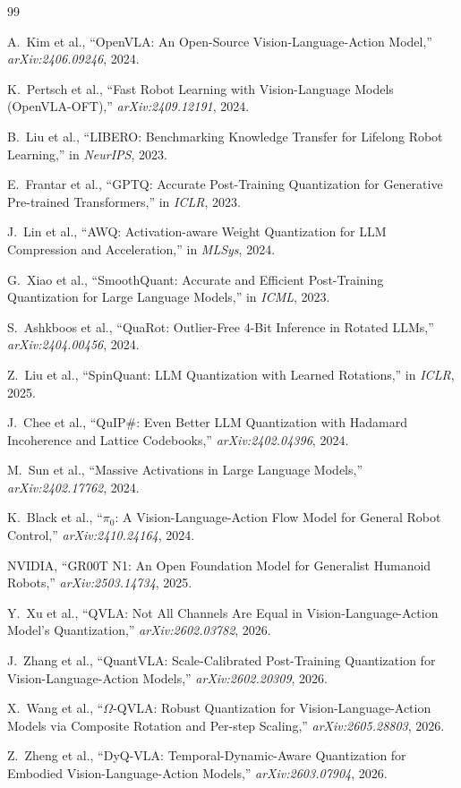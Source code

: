 \documentclass[conference]{IEEEtran}
\begin{document}
\begin{thebibliography}{99}

  A.~Kim et al., ``OpenVLA: An Open-Source Vision-Language-Action Model,''
  \textit{arXiv:2406.09246}, 2024.

  K.~Pertsch et al., ``Fast Robot Learning with Vision-Language Models (OpenVLA-OFT),''
  \textit{arXiv:2409.12191}, 2024.

  B.~Liu et al., ``LIBERO: Benchmarking Knowledge Transfer for Lifelong Robot Learning,''
  in \textit{NeurIPS}, 2023.

  E.~Frantar et al., ``GPTQ: Accurate Post-Training Quantization for Generative Pre-trained
  Transformers,'' in \textit{ICLR}, 2023.

  J.~Lin et al., ``AWQ: Activation-aware Weight Quantization for LLM Compression and
  Acceleration,'' in \textit{MLSys}, 2024.

  G.~Xiao et al., ``SmoothQuant: Accurate and Efficient Post-Training Quantization for
  Large Language Models,'' in \textit{ICML}, 2023.

  S.~Ashkboos et al., ``QuaRot: Outlier-Free 4-Bit Inference in Rotated LLMs,''
  \textit{arXiv:2404.00456}, 2024.

  Z.~Liu et al., ``SpinQuant: LLM Quantization with Learned Rotations,''
  in \textit{ICLR}, 2025.

  J.~Chee et al., ``QuIP\#: Even Better LLM Quantization with Hadamard Incoherence and
  Lattice Codebooks,'' \textit{arXiv:2402.04396}, 2024.

  M.~Sun et al., ``Massive Activations in Large Language Models,''
  \textit{arXiv:2402.17762}, 2024.

  K.~Black et al., ``$\pi_0$: A Vision-Language-Action Flow Model for General Robot
  Control,'' \textit{arXiv:2410.24164}, 2024.

  NVIDIA, ``GR00T N1: An Open Foundation Model for Generalist Humanoid Robots,''
  \textit{arXiv:2503.14734}, 2025.

  Y.~Xu et al., ``QVLA: Not All Channels Are Equal in Vision-Language-Action Model's
  Quantization,'' \textit{arXiv:2602.03782}, 2026.

  J.~Zhang et al., ``QuantVLA: Scale-Calibrated Post-Training Quantization for
  Vision-Language-Action Models,'' \textit{arXiv:2602.20309}, 2026.

  X.~Wang et al., ``$\Omega$-QVLA: Robust Quantization for Vision-Language-Action Models
  via Composite Rotation and Per-step Scaling,'' \textit{arXiv:2605.28803}, 2026.

  Z.~Zheng et al., ``DyQ-VLA: Temporal-Dynamic-Aware Quantization for Embodied
  Vision-Language-Action Models,'' \textit{arXiv:2603.07904}, 2026.

\end{thebibliography}
\end{document}
